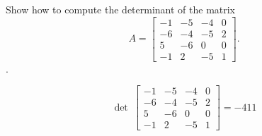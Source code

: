 
\begin{exerciseStatement}


Show how to compute the determinant of the matrix \[A= \left[\begin{array}{cccc}
-1 & -5 & -4 & 0 \\
-6 & -4 & -5 & 2 \\
5 & -6 & 0 & 0 \\
-1 & 2 & -5 & 1
\end{array}\right] .\].


\end{exerciseStatement}
    
\begin{exerciseAnswer} 
\[\operatorname{det}\  \left[\begin{array}{cccc}
-1 & -5 & -4 & 0 \\
-6 & -4 & -5 & 2 \\
5 & -6 & 0 & 0 \\
-1 & 2 & -5 & 1
\end{array}\right] = -411 \]
\end{exerciseAnswer}
    
